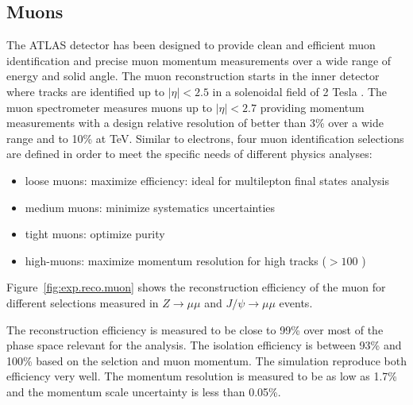 \subsection{Muons}

The ATLAS detector has been designed to provide clean and efficient 
muon identification and precise muon momentum measurements over 
a wide range of energy and solid angle. 
The muon  reconstruction starts in the inner 
detector where tracks are identified up to $|\eta|<2.5$ in a solenoidal field of 2 Tesla .
The muon spectrometer  measures  muons up to $|\eta|<2.7$  
providing momentum measurements with a design relative resolution of better than 3\% over a wide 
\pt range and to 10\% at TeV.
Similar to electrons, four muon identification selections are defined in order to meet 
the specific needs of different physics analyses:
\begin{itemize}
\item loose muons: maximize efficiency: ideal for multilepton final states analysis
\item medium muons: minimize systematics uncertainties
\item tight muons: optimize  purity
\item high-\pt muons: maximize momentum resolution for high \pt tracks ($>100$ \GeV)  
\end{itemize}
Figure~\ref{fig:exp.reco.muon} shows the reconstruction efficiency of the muon for different selections measured in  $Z\to\mu\mu$ and $J/\psi\to\mu\mu$ events.

The reconstruction efficiency is measured to be close to 99\% over most of the phase space relevant for the analysis. 
The isolation efficiency is between 93\% and 100\% based on the selction and muon momentum. The simulation reproduce both efficiency very well.
The  momentum resolution is measured to be as low as 1.7\% and the momentum scale uncertainty is less than  0.05\%.

